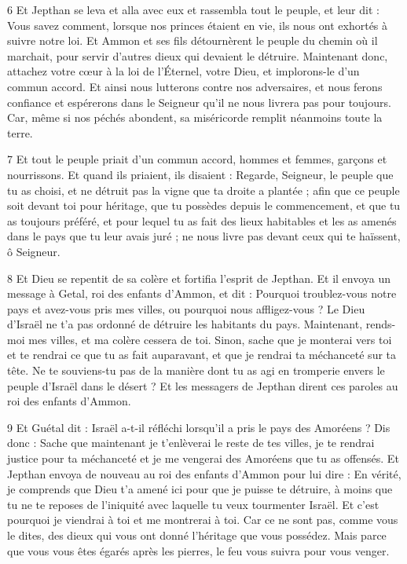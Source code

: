 \par 6 Et Jepthan se leva et alla avec eux et rassembla tout le peuple, et leur dit : Vous savez comment, lorsque nos princes étaient en vie, ils nous ont exhortés à suivre notre loi. Et Ammon et ses fils détournèrent le peuple du chemin où il marchait, pour servir d'autres dieux qui devaient le détruire. Maintenant donc, attachez votre cœur à la loi de l’Éternel, votre Dieu, et implorons-le d’un commun accord. Et ainsi nous lutterons contre nos adversaires, et nous ferons confiance et espérerons dans le Seigneur qu’il ne nous livrera pas pour toujours. Car, même si nos péchés abondent, sa miséricorde remplit néanmoins toute la terre.

\par 7 Et tout le peuple priait d'un commun accord, hommes et femmes, garçons et nourrissons. Et quand ils priaient, ils disaient : Regarde, Seigneur, le peuple que tu as choisi, et ne détruit pas la vigne que ta droite a plantée ; afin que ce peuple soit devant toi pour héritage, que tu possèdes depuis le commencement, et que tu as toujours préféré, et pour lequel tu as fait des lieux habitables et les as amenés dans le pays que tu leur avais juré ; ne nous livre pas devant ceux qui te haïssent, ô Seigneur.

\par 8 Et Dieu se repentit de sa colère et fortifia l'esprit de Jepthan. Et il envoya un message à Getal, roi des enfants d'Ammon, et dit : Pourquoi troublez-vous notre pays et avez-vous pris mes villes, ou pourquoi nous affligez-vous ? Le Dieu d'Israël ne t'a pas ordonné de détruire les habitants du pays. Maintenant, rends-moi mes villes, et ma colère cessera de toi. Sinon, sache que je monterai vers toi et te rendrai ce que tu as fait auparavant, et que je rendrai ta méchanceté sur ta tête. Ne te souviens-tu pas de la manière dont tu as agi en tromperie envers le peuple d'Israël dans le désert ? Et les messagers de Jepthan dirent ces paroles au roi des enfants d'Ammon.

\par 9 Et Guétal dit : Israël a-t-il réfléchi lorsqu'il a pris le pays des Amoréens ? Dis donc : Sache que maintenant je t'enlèverai le reste de tes villes, je te rendrai justice pour ta méchanceté et je me vengerai des Amoréens que tu as offensés. Et Jepthan envoya de nouveau au roi des enfants d'Ammon pour lui dire : En vérité, je comprends que Dieu t'a amené ici pour que je puisse te détruire, à moins que tu ne te reposes de l'iniquité avec laquelle tu veux tourmenter Israël. Et c'est pourquoi je viendrai à toi et me montrerai à toi. Car ce ne sont pas, comme vous le dites, des dieux qui vous ont donné l'héritage que vous possédez. Mais parce que vous vous êtes égarés après les pierres, le feu vous suivra pour vous venger.

